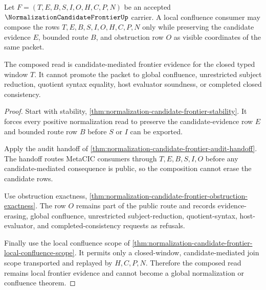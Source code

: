 \begin{theorem}
\label{thm:normalization-candidate-frontier-candidate-mediated-confluence}
Let $F=(T,E,B,S,I,O,H,C,P,N)$ be an accepted $\NormalizationCandidateFrontierUp$ carrier. A local confluence consumer may compose the rows $T,E,B,S,I,O,H,C,P,N$ only while preserving the candidate evidence $E$, bounded route $B$, and obstruction row $O$ as visible coordinates of the same packet.

The composed read is candidate-mediated frontier evidence for the closed typed window $T$. It cannot promote the packet to global confluence, unrestricted subject reduction, quotient syntax equality, host evaluator soundness, or completed closed consistency.
\end{theorem}
\begin{proof}
Start with stability, \autoref{thm:normalization-candidate-frontier-stability}. It forces every positive normalization read to preserve the candidate-evidence row $E$ and bounded route row $B$ before $S$ or $I$ can be exported.

Apply the audit handoff of \autoref{thm:normalization-candidate-frontier-audit-handoff}. The handoff routes MetaCIC consumers through $T,E,B,S,I,O$ before any candidate-mediated consequence is public, so the composition cannot erase the candidate rows.

Use obstruction exactness, \autoref{thm:normalization-candidate-frontier-obstruction-exactness}. The row $O$ remains part of the public route and records evidence-erasing, global confluence, unrestricted subject-reduction, quotient-syntax, host-evaluator, and completed-consistency requests as refusals.

Finally use the local confluence scope of \autoref{thm:normalization-candidate-frontier-local-confluence-scope}. It permits only a closed-window, candidate-mediated join scope transported and replayed by $H,C,P,N$. Therefore the composed read remains local frontier evidence and cannot become a global normalization or confluence theorem.
\end{proof}


